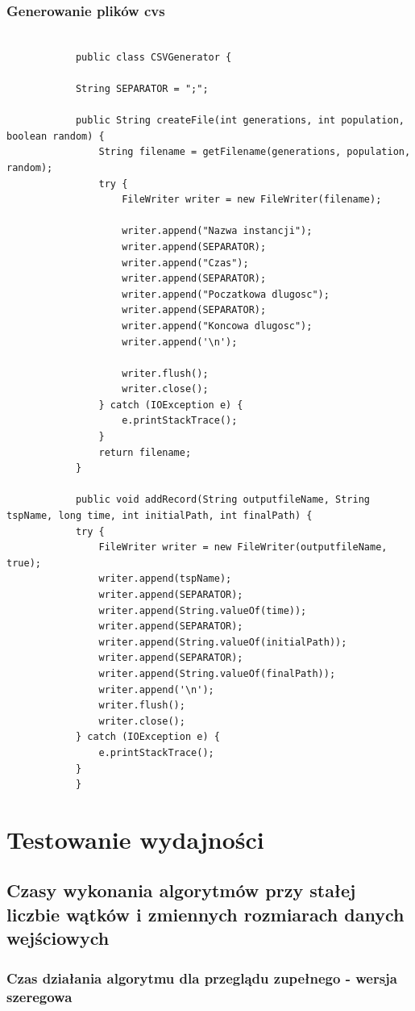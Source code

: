 \documentclass{article}
\begin{document}
		\subsubsection{Generowanie plików cvs}
			\begin{lstlisting}[xleftmargin=-150pt]
			
			public class CSVGenerator {
			
			String SEPARATOR = ";";
			
			public String createFile(int generations, int population, boolean random) {
				String filename = getFilename(generations, population, random);
				try {
					FileWriter writer = new FileWriter(filename);
					
					writer.append("Nazwa instancji");
					writer.append(SEPARATOR);
					writer.append("Czas");
					writer.append(SEPARATOR);
					writer.append("Poczatkowa dlugosc");
					writer.append(SEPARATOR);
					writer.append("Koncowa dlugosc");
					writer.append('\n');
					
					writer.flush();
					writer.close();
				} catch (IOException e) {
					e.printStackTrace();
				}
				return filename;
			}
			
			public void addRecord(String outputfileName, String tspName, long time, int initialPath, int finalPath) {
			try {
				FileWriter writer = new FileWriter(outputfileName, true);
				writer.append(tspName);
				writer.append(SEPARATOR);
				writer.append(String.valueOf(time));
				writer.append(SEPARATOR);
				writer.append(String.valueOf(initialPath));
				writer.append(SEPARATOR);
				writer.append(String.valueOf(finalPath));
				writer.append('\n');
				writer.flush();
				writer.close();
			} catch (IOException e) {
				e.printStackTrace();
			}
			}
			\end{lstlisting}
			\newpage
\section{Testowanie wydajności}	
	\subsection{Czasy wykonania algorytmów przy stałej liczbie wątków i zmiennych rozmiarach danych wejściowych}
		
		
		
		\subsubsection{Czas działania algorytmu dla przeglądu zupełnego - wersja szeregowa}
			
\end{document}
